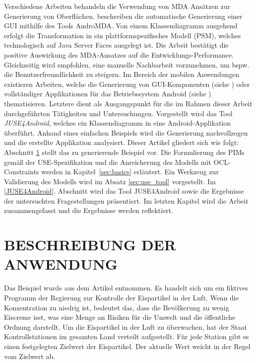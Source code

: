 \documentclass[a4paper,twoside]{article}
\begin{document}
Verschiedene Arbeiten behandeln die Verwendung von MDA Ansätzen zur Generierung von Oberflächen. \cite{GUI_MDA} beschreiben die automatische Generierung einer GUI mithilfe des Tools AndroMDA. Von einem Klassendiagramm ausgehend erfolgt die Transformation in ein plattformspezifisches Modell (PSM), welches technologisch auf Java Server Faces ausgelegt ist. Die Arbeit bestätigt die positive Auswirkung des MDA-Ansatzes auf die Entwicklungs-Performance. Gleichzeitig wird empfohlen, eine manuelle Nachbarbeit vorzunehmen, um bspw. die Benutzerfreundlichkeit zu steigern.
Im Bereich der mobilen Anwendungen existieren Arbeiten, welche die Generierung von GUI-Komponenten (siehe \cite{GUI_MDA_Android}) oder vollständiger Applikationen für das Betriebssystem Android (siehe \cite{JUSE}) thematisieren. Letztere dient als Ausgangspunkt für die im Rahmen dieser Arbeit durchgeführten Tätigkeiten und Untersuchungen. Vorgestellt wird das Tool \textit{JUSE4Android}, welches ein Klassendiagramm in eine Android-Applikation überführt. Anhand eines einfachen Beispiels wird die Generierung nachvollzogen und die erstellte Applikation analysiert. Dieser Artikel gliedert sich wie folgt: Abschnitt \ref{sec:iceCream} stellt das zu generierende Beispiel vor. Die Formulierung des PIMs gemäß der    
USE-Spezifikation und die Anreicherung des Modells mit OCL-Constraints werden in Kapitel~\ref{sec:basics} erläutert. Ein Werkzeug zur Validierung des Modells wird im  Absatz \ref{sec:use_tool} vorgestellt. Im \ref{JUSE4Android}. Abschnitt wird das Tool JUSE4Android sowie die Ergebnisse der untersuchten Fragestellungen präsentiert. Im letzten Kapitel wird die Arbeit zusammengefasst und die Ergebnisse werden reflektiert.

\section{\uppercase{Beschreibung der Anwendung}}
\label{sec:iceCream}
\noindent
Das Beispiel wurde aus dem Artikel \cite{Gui06} entnommen. Es handelt sich um ein fiktives Programm der Regierung zur Kontrolle der Eispartikel in der Luft. Wenn die Konzentration zu niedrig ist, bedeutet das, dass die Bevölkerung zu wenig Eiscreme isst, was eine Menge an Risiken für die Umwelt und die öffentliche Ordnung darstellt. Um die Eispartikel in der Luft zu überwachen, hat der Staat Kontrollstationen im gesamten Land verteilt aufgestellt. Für jede Station gibt es einen festgelegten Zielwert der Eispartikel. Der aktuelle Wert weicht in der Regel vom Zielwert ab. 
\\
\end{document}
